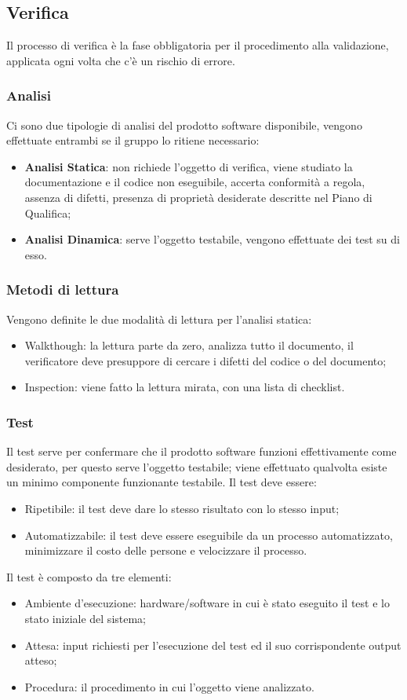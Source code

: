 \subsection{Verifica}
Il processo di verifica è la fase obbligatoria per il procedimento alla validazione, applicata ogni volta che c’è un rischio di errore.
\subsubsection{Analisi}
Ci sono due tipologie di analisi del prodotto software disponibile, vengono effettuate entrambi se il gruppo lo ritiene necessario:
\begin{itemize}
\item \textbf{Analisi Statica}: non richiede l’oggetto di verifica, viene studiato la documentazione e il codice non eseguibile, accerta conformità a regola, assenza di difetti, presenza di proprietà desiderate descritte nel Piano di Qualifica;
\item \textbf{Analisi Dinamica}: serve l’oggetto testabile, vengono effettuate dei test su di esso.
\end{itemize}

\subsubsection{Metodi di lettura}
Vengono definite le due modalità di lettura per l’analisi statica:
\begin{itemize}
\item Walkthough: la lettura parte da zero, analizza tutto il documento, il verificatore deve presuppore di cercare i difetti del codice o del documento;
\item Inspection: viene fatto la lettura mirata, con una lista di checklist.
\end{itemize}

\subsubsection{Test}
Il test serve per confermare che il prodotto software funzioni effettivamente come desiderato, per questo serve l’oggetto testabile; viene effettuato qualvolta esiste un minimo componente funzionante testabile.
Il test deve essere: 
\begin{itemize}
\item Ripetibile: il test deve dare lo stesso risultato con lo stesso input;
\item Automatizzabile: il test deve essere eseguibile da un processo automatizzato, minimizzare il costo delle persone e velocizzare il processo.
\end{itemize}
Il test è composto da tre elementi:
\begin{itemize}
\item Ambiente d’esecuzione: hardware/software in cui è stato eseguito il test e lo stato iniziale del sistema;
\item Attesa: input richiesti per l’esecuzione del test ed il suo corrispondente output atteso;
\item Procedura: il procedimento in cui l’oggetto viene analizzato.
\end{itemize}

